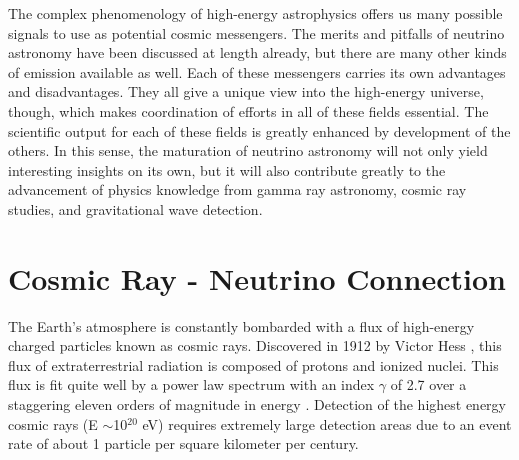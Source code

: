 \documentclass{gatech-thesis}
\begin{document}
The complex phenomenology of high-energy astrophysics offers us many possible signals to use as potential cosmic messengers. The merits and pitfalls of neutrino astronomy have been discussed at length already, but there are many other kinds of emission available as well. Each of these messengers carries its own advantages and disadvantages. They all give a unique view into the high-energy universe, though, which makes coordination of efforts in all of these fields essential. The scientific output for each of these fields is greatly enhanced by development of the others. In this sense, the maturation of neutrino astronomy will not only yield interesting insights on its own, but it will also contribute greatly to the advancement of physics knowledge from gamma ray astronomy, cosmic ray studies, and gravitational wave detection.
\section{Cosmic Ray - Neutrino Connection}
The Earth's atmosphere is constantly bombarded with a flux of high-energy charged particles known as cosmic rays. Discovered in 1912 by Victor Hess \cite{1930NW.....18.1094H}, this flux of extraterrestrial radiation is composed of protons and ionized nuclei. This flux is fit quite well by a power law spectrum with an index $\gamma$ of 2.7 over a staggering eleven orders of magnitude in energy \cite{1990cup..book.....G}. Detection of the highest energy cosmic rays (E $\sim$10$^{20}$ eV) requires extremely large detection areas due to an event rate of about 1 particle per square kilometer per century.
\end{document}
